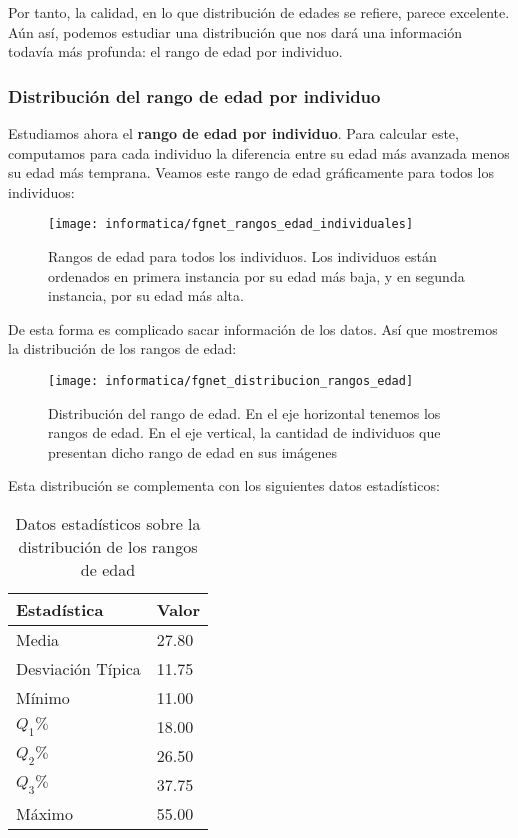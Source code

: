 Por tanto, la calidad, en lo que distribución de edades se refiere, parece excelente. Aún así, podemos estudiar una distribución que nos dará una información todavía más profunda: el rango de edad por individuo.

\subsubsection{Distribución del rango de edad por individuo} \label{isubsubs:fgnet_rango_edades}

Estudiamos ahora el \textbf{rango de edad por individuo}. Para calcular este, computamos para cada individuo la diferencia entre su edad más avanzada menos su edad más temprana. Veamos este rango de edad gráficamente para todos los individuos:

\begin{figure}[H]
    \centering
    \texttt{[image: informatica/fgnet\_rangos\_edad\_individuales]}
    \caption{Rangos de edad para todos los individuos. Los individuos están ordenados en primera instancia por su edad más baja, y en segunda instancia, por su edad más alta.}
    \label{img:fgnet_rangos_individuales}
\end{figure}

De esta forma es complicado sacar información de los datos. Así que mostremos la distribución de los rangos de edad:

\begin{figure}[H]
    \centering
    \texttt{[image: informatica/fgnet\_distribucion\_rangos\_edad]}
    \caption{Distribución del rango de edad. En el eje horizontal tenemos los rangos de edad. En el eje vertical, la cantidad de individuos que presentan dicho rango de edad en sus imágenes}
    \label{img:fgnet_rangos_distribucion}
\end{figure}

Esta distribución se complementa con los siguientes datos estadísticos:

\begin{table}[H]
\centering
\begin{tabular}{|l|l|}
    \hline
    \textbf{Estadística} & \textbf{Valor} \\
    \hline

    Media             & 27.80 \\
    Desviación Típica & 11.75 \\
    Mínimo            & 11.00 \\
    $Q_1 \%$          & 18.00 \\
    $Q_2 \%$          & 26.50 \\
    $Q_3 \%$          & 37.75 \\
    Máximo            & 55.00 \\

    \hline

\end{tabular}
\caption{Datos estadísticos sobre la distribución de los rangos de edad}
\label{table:fgnet_rangos_estadisticas}
\end{table}

